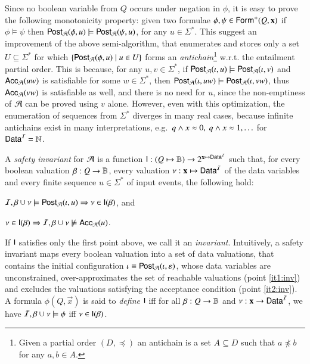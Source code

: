 \documentclass[10pt,conference,letterpaper,twocolumn]{IEEEtran}
\begin{document}
Since no boolean variable from $Q$ occurs under negation in $\phi$, it
is easy to prove the following monotonicity property: given two
formulae $\phi,\psi \in \mathsf{Form}^+(Q,\mathbf x)$ if $\phi \models \psi$
then $\mathsf{Post}_{\mathcal{A}}(\phi,u) \models \mathsf{Post}_{\mathcal{A}}(\psi,u)$, for any $u \in
\Sigma^*$. This suggest an improvement of the above semi-algorithm,
that enumerates and stores only a set $U \subseteq \Sigma^*$ for which
$\left\{ \mathsf{Post}_{\mathcal{A}}(\phi,u) \mid u \in U \right\}$ forms an
\emph{antichain}\footnote{Given a partial order $(D,\preceq)$ an
  antichain is a set $A \subseteq D$ such that $a \not\preceq b$ for
  any $a,b \in A$.} w.r.t. the entailment partial order. This is
because, for any $u,v \in \Sigma^*$, if $\mathsf{Post}_{\mathcal{A}}(\iota,u) \models
\mathsf{Post}_{\mathcal{A}}(\iota,v)$ and $\mathsf{Acc}_{\mathcal{A}}(uw)$ is satisfiable for some $w
\in \Sigma^*$, then $\mathsf{Post}_{\mathcal{A}}(\iota,uw) \models \mathsf{Post}_{\mathcal{A}}(\iota,vw)$,
thus $\mathsf{Acc}_{\mathcal{A}}(vw)$ is satisfiable as well, and there is no need
for $u$, since the non-emptiness of $\mathcal{A}$ can be proved using $v$
alone. However, even with this optimization, the enumeration of
sequences from $\Sigma^*$ diverges in many real cases, because
infinite antichains exist in many interpretations, e.g.\ $q \wedge x
\approx 0,~ q \wedge x \approx 1, \ldots$ for $\mathsf{Data}^{\mathcal{I}} = {\bf \mathbb{N}}$.

A \emph{safety invariant} for $\mathcal{A}$ is a function $\mathsf{I} : (Q \mapsto
\mathbb{B}) \rightarrow 2^{\mathbf x \mapsto \mathsf{Data}^{\mathcal{I}}}$ such that, for every
boolean valuation $\beta : Q \rightarrow \mathbb{B}$, every valuation $\nu
: \mathbf x \mapsto \mathsf{Data}^{\mathcal{I}}$ of the data variables and every finite
sequence $u \in \Sigma^*$ of input events, the following
hold: \begin{compactenum}
%
\item\label{it1:inv} $\mathcal{I},\beta \cup \nu \models \mathsf{Post}_{\mathcal{A}}(\iota,u)
  \Rightarrow \nu \in \mathsf{I}(\beta)$, and
%
\item\label{it2:inv} $\nu \in \mathsf{I}(\beta) \Rightarrow \mathcal{I},\beta \cup
  \nu \not\models \mathsf{Acc}_{\mathcal{A}}(u)$.
\end{compactenum}
If $\mathsf{I}$ satisfies only the first point above, we call it an
\emph{invariant}. Intuitively, a safety invariant maps every boolean
valuation into a set of data valuations, that contains the initial
configuration $\iota \equiv \mathsf{Post}_{\mathcal{A}}(\iota,\varepsilon)$, whose data
variables are unconstrained, over-approximates the set of reachable
valuations (point \ref{it1:inv}) and excludes the valuations satisfying the
acceptance condition (point \ref{it2:inv}).  A formula $\phi(Q,\vec{x})$
is said to \emph{define} $\mathsf{I}$ iff for all $\beta: Q \rightarrow \mathbb{B}$ and
$\nu : \mathbf x \rightarrow \mathsf{Data}^{\mathcal{I}}$, we have $\mathcal{I},\beta\cup\nu \models
\phi$ iff $\nu \in \mathsf{I}(\beta)$.
\end{document}
